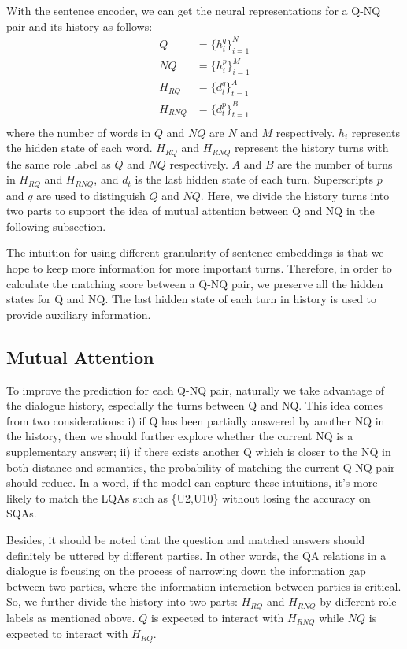 With the sentence encoder, we can get the neural representations for a Q-NQ pair and its history as follows:
\begin{equation}
\begin{aligned}
Q&=\{h_i^q\}_{i=1}^{N}\\
NQ&= \{h_i^p\}_{i=1}^{M}\\
H_{RQ}&=\{d_t^q\}_{t=1}^{A}\\
H_{RNQ}&=\{d_t^p\}_{t=1}^{B}\\
\end{aligned}
\end{equation}
where the number of words in $Q$ and $NQ$ are $N$ and $M$ respectively. $h_i$ represents the hidden state of each word. $H_{RQ}$ and $H_{RNQ}$ represent the history turns with the same role label as $Q$ and $NQ$ respectively. $A$ and $B$ are the number of turns in $H_{RQ}$ and $H_{RNQ}$, and $d_t$ is the last hidden state of each turn. Superscripts $p$ and $q$ are used to distinguish $Q$ and $NQ$. Here, we divide the history turns into 
two parts to support the idea of mutual attention between Q and NQ
in the following subsection.

The intuition for using different granularity of sentence embeddings is that we hope to 
keep more information for more important turns. Therefore, in order to calculate 
the matching score between a Q-NQ pair, we preserve all the hidden states for Q and NQ. 
The last hidden state of each turn in history is used to provide auxiliary information.



\subsection{Mutual Attention}
\label{sec:mutual attention}
To improve the prediction for each Q-NQ pair, 
naturally we take advantage of the dialogue history, 
especially the turns between Q and NQ. 
This idea comes from two considerations: i) if Q has been partially answered 
by another NQ in the history, then we should further explore 
whether the current NQ is a supplementary answer; ii) if there exists another Q which is closer 
to the NQ in both distance and semantics, the probability of matching 
the current Q-NQ pair should reduce. In a word, 
if the model can capture these intuitions, it's more likely to match 
the LQAs such as \{U2,U10\} without losing the accuracy on SQAs.


Besides, it should be noted that the question and matched answers should
definitely be uttered by different parties. 
In other words, the QA relations in a dialogue is focusing 
on the process of narrowing down the information gap between two parties, 
where the information interaction between parties is critical. 
So, we further divide the history into two parts: 
$H_{RQ}$ and $H_{RNQ}$ by different role labels as mentioned above. 
$Q$ is expected to interact with $H_{RNQ}$ while $NQ$ is expected to interact with $H_{RQ}$.

